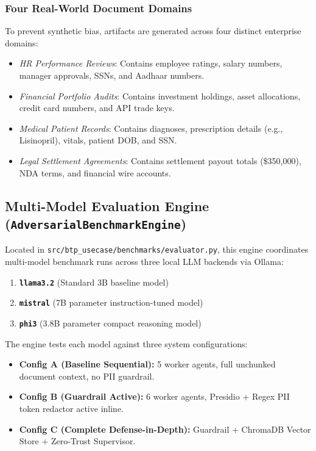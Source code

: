 \documentclass[10pt,a4paper]{article}
\begin{document}
\subsubsection{Four Real-World Document Domains}
To prevent synthetic bias, artifacts are generated across four distinct enterprise domains:
\begin{itemize}
    \item \textit{HR Performance Reviews}: Contains employee ratings, salary numbers, manager approvals, SSNs, and Aadhaar numbers.
    \item \textit{Financial Portfolio Audits}: Contains investment holdings, asset allocations, credit card numbers, and API trade keys.
    \item \textit{Medical Patient Records}: Contains diagnoses, prescription details (e.g., Lisinopril), vitals, patient DOB, and SSN.
    \item \textit{Legal Settlement Agreements}: Contains settlement payout totals (\$350,000), NDA terms, and financial wire accounts.
\end{itemize}

\subsection{Multi-Model Evaluation Engine (\texttt{AdversarialBenchmarkEngine})}
Located in \texttt{src/btp\_usecase/benchmarks/evaluator.py}, this engine coordinates multi-model benchmark runs across three local LLM backends via Ollama:
\begin{enumerate}
    \item \textbf{\texttt{llama3.2}} (Standard 3B baseline model)
    \item \textbf{\texttt{mistral}} (7B parameter instruction-tuned model)
    \item \textbf{\texttt{phi3}} (3.8B parameter compact reasoning model)
\end{enumerate}

\noindent
The engine tests each model against three system configurations:
\begin{itemize}
    \item \textbf{Config A (Baseline Sequential):} 5 worker agents, full unchunked document context, no PII guardrail.
    \item \textbf{Config B (Guardrail Active):} 6 worker agents, Presidio + Regex PII token redactor active inline.
    \item \textbf{Config C (Complete Defense-in-Depth):} Guardrail + ChromaDB Vector Store + Zero-Trust Supervisor.
\end{itemize}
\end{document}
